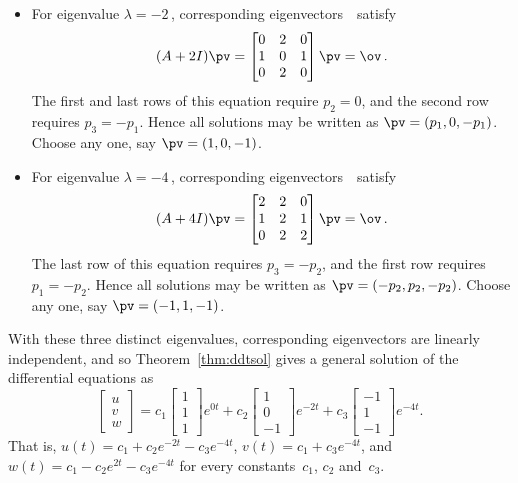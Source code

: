 \begin{example}
\begin{solution}
\begin{itemize}
\item For eigenvalue \(\lambda=-2\)\,, corresponding eigenvectors~\pv\ satisfy
\begin{equation*}
(A+2I)\pv=\begin{bmatrix} 0&2&0\\1&0&1\\0&2&0 \end{bmatrix}\pv=\ov\,.
\end{equation*}
The first and last rows of this equation require \(p_2=0\), and the second row requires \(p_3=-p_1\).
Hence all solutions may be written as \(\pv=(p_1,0,-p_1)\).
Choose any one, say \(\pv=(1,0,-1)\).

\item For eigenvalue \(\lambda=-4\)\,, corresponding eigenvectors~\pv\ satisfy
\begin{equation*}
(A+4I)\pv=\begin{bmatrix} 2&2&0\\1&2&1\\0&2&2 \end{bmatrix}\pv=\ov\,.
\end{equation*}
The last row of this equation requires \(p_3=-p_2\), and the first row requires \(p_1=-p_2\).
Hence all solutions may be written as \(\pv=(-p_2,p_2,-p_2)\).
Choose any one, say \(\pv=(-1,1,-1)\).

\end{itemize}
With these three distinct eigenvalues, corresponding eigenvectors are linearly independent, and so Theorem~\ref{thm:ddtsol} gives a general solution of the differential equations as
\begin{equation*}
\begin{bmatrix} u\\v\\w \end{bmatrix}
=c_1\begin{bmatrix} 1\\1\\1 \end{bmatrix}e^{0t}
+c_2\begin{bmatrix} 1\\0\\-1 \end{bmatrix}e^{-2t}
+c_3\begin{bmatrix} -1\\1\\-1 \end{bmatrix}e^{-4t}.
\end{equation*}
That is, \(u(t)=c_1+c_2e^{-2t}-c_3e^{-4t}\), \(v(t)=c_1+c_3e^{-4t}\), and \(w(t)=c_1-c_2e^{2t}-c_3e^{-4t}\) for every constants~\(c_1\), \(c_2\) and~\(c_3\).
\end{solution}
\end{example}





